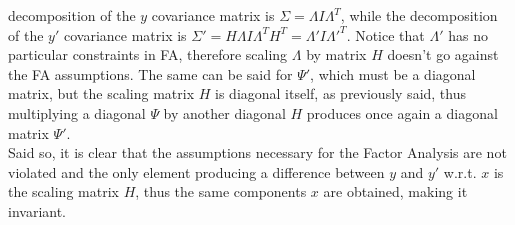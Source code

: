 decomposition of the \(y\) covariance matrix is
\(\Sigma=\Lambda I \Lambda^T\), while the decomposition of the \(y'\)
covariance matrix is \(\Sigma'=H\Lambda I\Lambda^T H^T = \Lambda'I\Lambda'^T\).
Notice that \(\Lambda'\) has no particular constraints in FA, therefore scaling
\(\Lambda\) by matrix \(H\) doesn't go against the FA assumptions.
The same can be said for \(\Psi'\), which must be a diagonal matrix, but the
scaling matrix \(H\) is diagonal itself, as previously said, thus multiplying
a diagonal \(\Psi\) by another diagonal \(H\) produces once again a diagonal
matrix \(\Psi'\).\\
Said so, it is clear that the assumptions necessary for the Factor Analysis
are not violated and the only element producing a difference between \(y\)
and \(y'\) w.r.t. \(x\) is the scaling matrix \(H\), thus the same
components \(x\) are obtained, making it invariant.